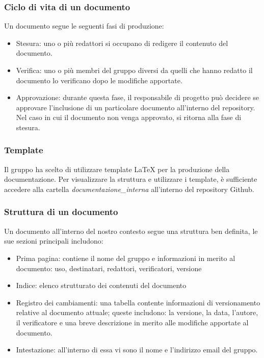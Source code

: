 \documentclass[12pt, oneside]{article}
\begin{document}
\subsubsection{Ciclo di vita di un documento}
Un documento segue le seguenti fasi di produzione:
\begin{itemize}
    \item Stesura: uno o più redattori si occupano di redigere il contenuto del documento.
    \item Verifica: uno o più membri del gruppo diversi da quelli che hanno redatto il documento lo verificano dopo le modifiche apportate.
    \item Approvazione: durante questa fase, il responsabile di progetto può decidere se approvare l'inclusione di un particolare documento all'interno del repository. Nel caso in cui il documento non venga approvato, si ritorna alla fase di stesura.
\end{itemize}
\subsubsection{Template}
Il gruppo ha scelto di utilizzare template LaTeX per la produzione della documentazione. Per visualizzare la struttura e utilizzare i template, è sufficiente accedere alla cartella \textit{documentazione\_interna} all'interno del repository Github.

\subsubsection{Struttura di un documento}
Un documento all'interno del nostro contesto segue una struttura ben definita, le sue sezioni principali includono:
\begin{itemize}
    \item Prima pagina: contiene il nome del gruppo e informazioni in merito al documento: uso, destinatari, redattori, verificatori, versione
    \item Indice: elenco strutturato dei contenuti del documento
    \item Registro dei cambiamenti: una tabella contente informazioni di versionamento relative al documento attuale; queste includono: la versione, la data, l'autore, il verificatore e una breve descrizione in merito alle modifiche apportate al documento.
    \item Intestazione: all'interno di essa vi sono il nome e l'indirizzo email del gruppo.
\end{itemize}
\end{document}
